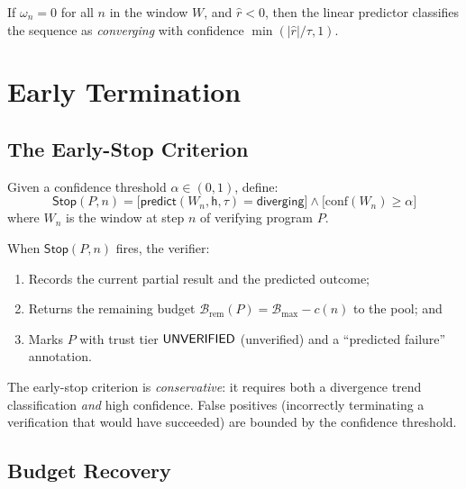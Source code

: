 \documentclass[11pt]{article}
\newcommand{\Horizon}{\mathsf{h}}           %
\newcommand{\Budget}{\mathcal{B}}           %
\newcommand{\BudgetRem}[1]{\Budget_{\mathrm{rem}}(#1)}
\newcommand{\DescentRate}{r}                %
\newcommand{\EarlyStop}{\mathsf{Stop}}      %
\newcommand{\ObsRank}{\omega}               %
\newcommand{\Thresh}{\tau}                  %
\newcommand{\Predict}{\mathsf{predict}}     %
\begin{document}
\begin{proposition}\label{prop:H1-vanishing}
If $\ObsRank_n = 0$ for all $n$ in the window $W$, and $\hat{\DescentRate} < 0$,
then the linear predictor classifies the sequence as \emph{converging}
with confidence $\min(|\hat{\DescentRate}|/\Thresh, 1)$.
\end{proposition}

\section{Early Termination}\label{sec:early}

\subsection{The Early-Stop Criterion}

\begin{definition}\label{def:early-stop}
Given a confidence threshold $\alpha \in (0,1)$, define:
\[
  \EarlyStop(P, n) = \bigl[\Predict(W_n, \Horizon, \Thresh) = \mathsf{diverging}\bigr]
                    \wedge \bigl[\mathrm{conf}(W_n) \ge \alpha\bigr]
\]
where $W_n$ is the window at step $n$ of verifying program $P$.
\end{definition}

When $\EarlyStop(P, n)$ fires, the verifier:
\begin{enumerate}
  \item Records the current partial result and the predicted outcome;
  \item Returns the remaining budget $\BudgetRem{P} = \Budget_{\max} - c(n)$
        to the pool; and
  \item Marks $P$ with trust tier $\mathsf{UNVERIFIED}$ (unverified) and a
        ``predicted failure'' annotation.
\end{enumerate}

\noindent
The early-stop criterion is \emph{conservative}: it requires both a
divergence trend classification \emph{and} high confidence.  False
positives (incorrectly terminating a verification that would have
succeeded) are bounded by the confidence threshold.

\subsection{Budget Recovery}
\end{document}
